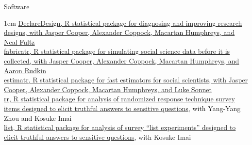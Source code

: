 \documentclass[10.9pt]{article}
\makeatletter
\newcommand\donotbreakhere{\par\nobreak\@afterheading\vspace{1em}}
\newenvironment{indnt}{\begin{adjustwidth}{1em}{}}{\end{adjustwidth}}
\makeatother
\begin{document}
{\large Software}\donotbreakhere
\begin{indnt}
 \href{https://declaredesign.org}{DeclareDesign, R statistical package for diagnosing and improving research designs, with Jasper Cooper, Alexander Coppock, Macartan Humphreys, and Neal Fultz}\\[.75em]
 \href{https://declaredesign.org/r/fabricatr}{fabricatr, R statistical package for simulating social science data before it is collected, with Jasper Cooper, Alexander Coppock, Macartan Humphreys, and Aaron Rudkin}\\[.75em]
 \href{https://declaredesign.org/r/estimatr}{estimatr, R statistical package for fast estimators for social scientists, with Jasper Cooper, Alexander Coppock, Macartan Humphreys, and Luke Sonnet}\\[.75em]
\href{http://rr.sensitivequestions.org}{rr, R statistical package for analysis of randomized response technique survey items designed to elicit truthful answers to sensitive questions}, with Yang-Yang Zhou and Kosuke Imai\\[.75em]
\href{http://list.sensitivequestions.org}{list, R statistical package for analysis of survey ``list experiments'' designed to elicit truthful answers to sensitive questions}, with Kosuke Imai
\end{indnt}
\vspace{1.5em}
 
\end{document}
